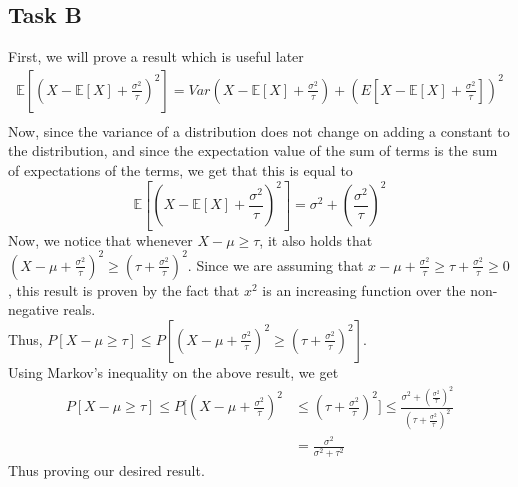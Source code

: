 \subsection{Task B}
First, we will prove a result which is useful later
\begin{align*}
    \mathbb{E}[\left(X-\mathbb{E}[X]+\frac{\sigma^2}{\tau}\right)^2]=Var(X-\mathbb{E}[X]+\frac{\sigma^2}{\tau})+\left(E[X-\mathbb{E}[X]+\frac{\sigma^2}{\tau}]\right)^2\\
\end{align*}
Now, since the variance of a distribution does not change on adding a constant to the distribution, and since the expectation value of the sum of terms is the sum of expectations of the terms, we get that this is equal to 
\[
    \mathbb{E}[\left(X-\mathbb{E}[X]+\frac{\sigma^2}{\tau}\right)^2]=\sigma^2+\left(\frac{\sigma^2}{\tau}\right)^2
\]
Now, we notice that whenever $X-\mu \ge \tau$, it also holds that $\left(X-\mu+\frac{\sigma^2}{\tau}\right)^2\ge\left(\tau +\frac{\sigma^2}{\tau}\right)^2$. Since we are assuming that $x-\mu+\frac{\sigma^2}{\tau}\ge \tau+\frac{\sigma^2}{\tau} \ge 0$, this result is proven by the fact that $x^2$ is an increasing function over the non-negative reals.\\
Thus, $P[X-\mu \ge \tau] \le P[\left(X-\mu+\frac{\sigma^2}{\tau}\right)^2\ge\left(\tau +\frac{\sigma^2}{\tau}\right)^2]$.\\
Using Markov's inequality on the above result, we get
\begin{align*}
    P[X-\mu \ge \tau] \le P[\left(X-\mu+\frac{\sigma^2}{\tau}\right)^2&\le\left(\tau +\frac{\sigma^2}{\tau}\right)^2]\le \frac{\sigma^2+\left(\frac{\sigma^2}{\tau}\right)^2}{\left(\tau+\frac{\sigma^2}{\tau}\right)^2}\\
    &=\frac{\sigma^2}{\sigma^2+\tau^2}
\end{align*}
Thus proving our desired result.
